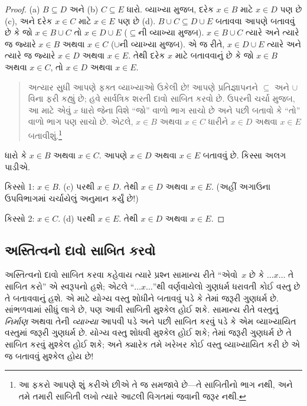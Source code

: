 \begin{proof}
  (a) $B \subseteq D$ અને (b) $C \subseteq E$ ધારો. વ્યાખ્યા
  મુજબ, દરેક $x \in B$ માટે $x \in D$ પણ છે (c), અને દરેક
  $x \in C$ માટે $x \in E$ પણ છે (d). $B \cup C \subseteq D \cup E$ બતાવવા
  આપણે બતાવવું છે કે જો $x \in B \cup C$ તો $x \in D \cup E$
  ($\subseteq$ની વ્યાખ્યા મુજબ). $x \in B \cup C$ ત્યારે
  અને ત્યારે જ જ્યારે $x \in B$ અથવા $x \in
  C$ ($\cup$ની વ્યાખ્યા મુજબ). એ જ રીતે, $x \in D \cup E$
  ત્યારે અને ત્યારે જ જ્યારે $x \in D$ અથવા $x \in E$.
  તેથી દરેક $x$ માટે બતાવવાનું છે કે જો $x \in B$ અથવા
  $x \in C$, તો $x \in D$ અથવા $x \in E$.

  \begin{quote}
  અત્યાર સુધી આપણે ફક્ત વ્યાખ્યાઓ ઉકેલી છે!{} આપણે
  પ્રતિજ્ઞાપનને $\subseteq$ અને $\cup$ વિના ફરી કહ્યું છે;
  હવે સાર્વત્રિક શરતી દાવો સાબિત કરવો છે. ઉપરની ચર્ચા મુજબ,
  આ માટે એવું $x$ ધારો જેના વિશે ``જો'' વાળો ભાગ સાચો છે
  અને પછી બતાવો કે ``તો'' વાળો ભાગ પણ સાચો છે. એટલે,
  $x
  \in B$ અથવા $x \in C$ ધારીને $x \in D$ અથવા $x \in
  E$ બતાવીશું.\footnote{આ ફકરો આપણે શું કરીએ છીએ તે જ સમજાવે
    છે---તે સાબિતીનો ભાગ નથી, અને તમે તમારી સાબિતી લખો ત્યારે
    આટલી વિગતમાં જવાની જરૂર નથી.}
  \end{quote}

  ધારો કે $x \in B$ અથવા $x \in C$. આપણે $x \in D$
  અથવા $x \in E$ બતાવવું છે. કિસ્સા અલગ પાડીએ.

  કિસ્સો 1: $x \in B$. (c) પરથી $x \in D$. તેથી $x \in D$ અથવા
  $x \in
  E$. (અહીં અગાઉના ઉપવિભાગમાં ચર્ચાયેલું અનુમાન કર્યું છે!)

  કિસ્સો 2: $x \in C$. (d) પરથી $x \in E$. તેથી $x \in D$ અથવા $x \in E$.
 \end{proof}

\subsection{અસ્તિત્વનો દાવો સાબિત કરવો}

અસ્તિત્વનો દાવો સાબિત કરવા કહેવાય ત્યારે પ્રશ્ન સામાન્ય રીતે
``એવો~$x$ છે કે $\dots x \dots$ તે સાબિત કરો'' એ સ્વરૂપનો
હશે; એટલે ``$\dots x
\dots$''થી વર્ણવાયેલો ગુણધર્મ ધરાવતી કોઈ વસ્તુ છે તે બતાવવાનું
હશે. એ માટે યોગ્ય વસ્તુ શોધીને બતાવવું પડે કે તેમાં જરૂરી
ગુણધર્મ છે. સાંભળવામાં સીધું લાગે છે, પણ આવી સાબિતી મુશ્કેલ
હોઈ શકે. સામાન્ય રીતે વસ્તુનું \emph{નિર્માણ} અથવા તેની
\emph{વ્યાખ્યા} આપવી પડે અને પછી સાબિત કરવું પડે કે એમ
વ્યાખ્યાયિત વસ્તુમાં જરૂરી ગુણધર્મ છે. યોગ્ય વસ્તુ શોધવી
મુશ્કેલ હોઈ શકે; તેમાં જરૂરી ગુણધર્મ છે તે સાબિત કરવું મુશ્કેલ
હોઈ શકે; અને ક્યારેક તમે ખરેખર કોઈ વસ્તુ વ્યાખ્યાયિત કરી છે
એ જ બતાવવું મુશ્કેલ હોય છે!{}

